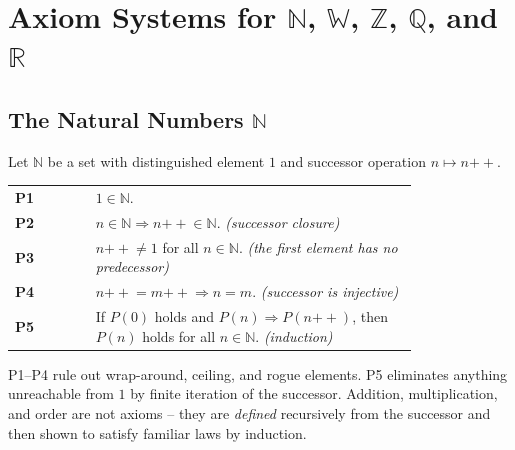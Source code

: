 
\section{Axiom Systems for $\mathbb{N}$, $\mathbb{W}$, $\mathbb{Z}$, $\mathbb{Q}$, and $\mathbb{R}$}
\label{sec:number-systems-axioms}

\subsection{The Natural Numbers $\mathbb{N}$}

\begin{tcolorbox}[colback=axiombox, colframe=axiomborder, arc=2pt,
  left=6pt, right=6pt, top=4pt, bottom=4pt,
  title={\small\textbf{One-Based Peano Axioms for $\mathbb{N}$}},
  fonttitle=\small\bfseries]
Let $\mathbb{N}$ be a set with distinguished element $1$
and successor operation $n \mapsto n{+\!\!+}$.

\medskip
\begin{tabular}{@{} l p{0.80\linewidth} @{}}
\textbf{P1} & $1 \in \mathbb{N}$. \\[4pt]
\textbf{P2} & $n \in \mathbb{N} \Rightarrow n{+\!\!+} \in \mathbb{N}$.
             \hfill\textit{(successor closure)} \\[4pt]
\textbf{P3} & $n{+\!\!+} \neq 1$ for all $n \in \mathbb{N}$.
             \hfill\textit{(the first element has no predecessor)} \\[4pt]
\textbf{P4} & $n{+\!\!+} = m{+\!\!+} \Rightarrow n = m$.
             \hfill\textit{(successor is injective)} \\[4pt]
\textbf{P5} & If $P(0)$ holds and $P(n) \Rightarrow P(n{+\!\!+})$,
             then $P(n)$ holds for all $n \in \mathbb{N}$.
             \hfill\textit{(induction)} \\
\end{tabular}
\end{tcolorbox}

\begin{remark}
P1--P4 rule out wrap-around, ceiling, and rogue elements.
P5 eliminates anything unreachable from $1$ by finite iteration of the
successor.
Addition, multiplication, and order are not axioms -- they are \emph{defined}
recursively from the successor and then shown to satisfy familiar laws by
induction.
\end{remark}

